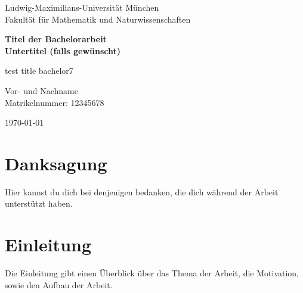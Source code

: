 \documentclass[12pt, reqno, titlepage]{amsart}
\begin{document}
\begin{titlepage}
    \centering
    \vspace*{1.5cm}
    
    {\Large Ludwig-Maximilians-Universität München\\[0.3cm]
    Fakultät für Mathematik und Naturwissenschaften}
    
    \vspace{1.5cm}
    
    {\huge\bfseries Titel der Bachelorarbeit\\[0.4cm]
    \Large Untertitel (falls gewünscht)}
    
    \vspace{2cm}
    
    {\Large test title bachelor7}
    
    \vspace{2cm}
    
    {\Large Vor- und Nachname\\[0.2cm]
    Matrikelnummer: 12345678}
    
    \vfill
    
    {\Large \today}
    
\end{titlepage}






\begin{abstract}
    Hier folgt eine kurze Zusammenfassung der Arbeit. Erläutere in wenigen Sätzen das Thema, die Methodik und die wichtigsten Ergebnisse.
\end{abstract}
\thispagestyle{empty}
\newpage

\section*{Danksagung}
Hier kannst du dich bei denjenigen bedanken, die dich während der Arbeit unterstützt haben. 
\thispagestyle{empty}
\newpage

\tableofcontents
\thispagestyle{empty}
\newpage

\listoffigures
\thispagestyle{empty}
\newpage

\listoftables
\thispagestyle{empty}
\newpage

\section{Einleitung}
Die Einleitung gibt einen Überblick über das Thema der Arbeit, die Motivation, sowie den Aufbau der Arbeit.
\end{document}
